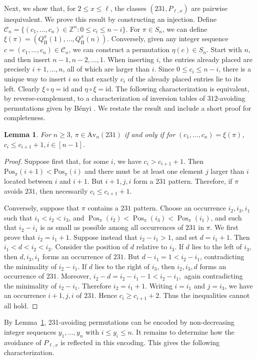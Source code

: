 \documentclass[11pt]{article}
\newtheorem{lem}[thm]{Lemma}
\begin{document}
Next, we show that, for $2\leq x\leq \ell$, the classes $(231,P_{\ell,x})$ are pairwise inequivalent. 
We prove this result by constructing an injection.
Define
$\mathcal C_n=\{(c_1,\dots,c_n)\in\mathbb Z^n:0\le c_i\le n-i\}$.
For $\pi\in S_n$, we can define $\xi(\pi)=(Q^\pi_{\mathrm{II}}(1),\dots,Q^\pi_{\mathrm{II}}(n))$.
Conversely, given any integer sequence $c=(c_1,\dots,c_n)\in\mathcal C_n$,
we can construct a permutation $\eta(c)\in S_n$. Start with $n$, and then insert
$n-1,n-2,\dots,1$. When inserting $i$, the entries already placed are precisely
$i+1,\dots,n$, all of which are larger than $i$. Since $0\le c_i\le n-i$,
there is a unique way to insert $i$ so that exactly $c_i$ of the already
placed entries lie to its left. Clearly $\xi\circ\eta=\text{id}$ and
$\eta\circ\xi=\text{id}$.
The following characterization is equivalent, by reverse-complement, 
to a characterization of inversion tables of $312$-avoiding permutations given by Bényi \cite{Benyi2014}. 
We restate the result and include a short proof for completeness.

\begin{lem}\label{lem_231_encoding}
For $n\geq 3$, $\pi\in\text{Av}_n(231)$ if and only if for $(c_1,\dots,c_n)=\xi(\pi)$,
$c_i\le c_{i+1}+1,i\in[n-1]$.
\end{lem}

\begin{proof}
Suppose first that, for some $i$, we have $c_i>c_{i+1}+1$. Then $\text{Pos}_\pi(i+1)<\text{Pos}_\pi(i)$
and there must be at least one element $j$ larger than $i$ located between $i$
and $i+1$. But $i+1,j,i$ form a $231$ pattern. Therefore, if $\pi$
avoids $231$, then necessarily $c_i\le c_{i+1}+1$.

Conversely, suppose that $\pi$ contains a $231$ pattern.
Choose an occurrence $i_2,i_3,i_1$ such that $i_1<i_2<i_3$, and
$\operatorname{Pos}_{\pi}(i_2)
<
\operatorname{Pos}_{\pi}(i_3)
<
\operatorname{Pos}_{\pi}(i_1)$,
and such that $i_2-i_1$ is as small as possible among all occurrences
of $231$ in $\pi$.
We first prove that $i_2=i_1+1$.
Suppose instead that $i_2-i_1>1$, and set $d=i_1+1$.
Then $i_1<d<i_2<i_3$.
Consider the position of $d$ relative to $i_3$.
If $d$ lies to the left of $i_3$, then
$d,i_3,i_1$
forms an occurrence of $231$. But
$d-i_1=1<i_2-i_1$,
contradicting the minimality of $i_2-i_1$.
If $d$ lies to the right of $i_3$, then
$i_2,i_3,d$
forms an occurrence of $231$. Moreover,
$i_2-d=i_2-i_1-1<i_2-i_1,$
again contradicting the minimality of $i_2-i_1$.
Therefore $i_2=i_1+1$. Writing $i=i_1$ and $j=i_3$, we have an
occurrence $i+1,j,i$ of $231$. 
Hence $c_i\geq c_{i+1}+2$.
Thus the inequalities cannot all hold.
\end{proof}
By Lemma~\ref{lem_231_encoding}, 231-avoiding permutations can be encoded by 
non-decreasing integer sequences $y_1,\ldots,y_n$ with $i\le y_i\le n$. 
It remains to determine how the avoidance of $P_{\ell,x}$ is reflected in this encoding. 
This gives the following characterization.
\end{document}
